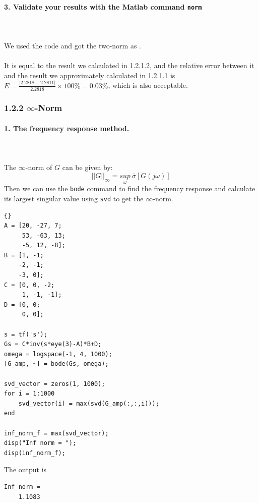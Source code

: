 \documentclass{article}
\begin{document}
\paragraph{3. Validate your results with the Matlab command \texttt{norm}}~\\~\\
We used the code  and got the two-norm as .~\\~\\
It is equal to the result we calculated in 1.2.1.2, and the relative error between it and the result we approximately calculated in 1.2.1.1 is $E=\frac{|2.2818-2.2811|}{2.2818}\times 100\%=0.03\%$, which is also acceptable.

\subsubsection*{1.2.2 $\infty$-Norm}
\paragraph{1. The frequency response method.}~\\~\\
The $\infty$-norm of $G$ can be given by:
\[||G||_\infty= \underset{\omega}{sup}~\overline{\sigma}[G(j\omega)]\]
Then we can use the \verb|bode| command to find the frequency response and calculate its largest singular value using \verb|svd| to get the $\infty$-norm.

\begin{lstlisting}{}
A = [20, -27, 7;
     53, -63, 13;
     -5, 12, -8];
B = [1, -1;
    -2, -1;
    -3, 0];
C = [0, 0, -2;
     1, -1, -1];
D = [0, 0;
     0, 0];

s = tf('s');
Gs = C*inv(s*eye(3)-A)*B+D;
omega = logspace(-1, 4, 1000);
[G_amp, ~] = bode(Gs, omega);

svd_vector = zeros(1, 1000);
for i = 1:1000
    svd_vector(i) = max(svd(G_amp(:,:,i)));
end

inf_norm_f = max(svd_vector);
disp("Inf norm = "); 
disp(inf_norm_f);
\end{lstlisting}
The output is 
\begin{lstlisting}[numbers=none]
Inf norm = 
    1.1083
\end{lstlisting}
\end{document}
